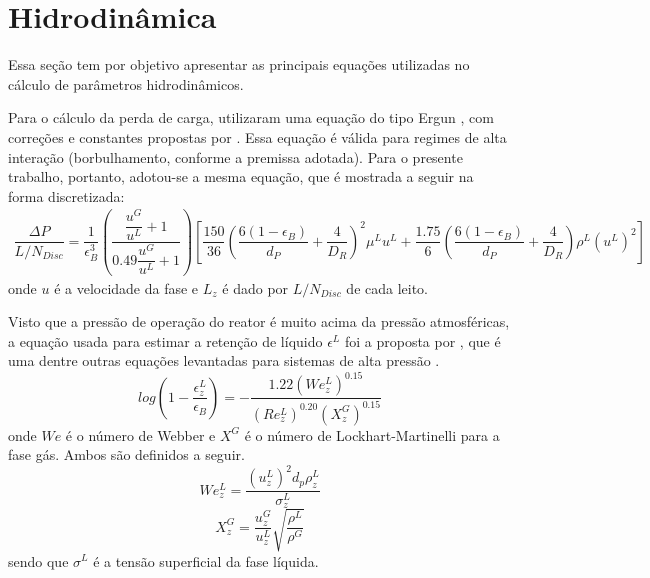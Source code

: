 
\section{Hidrodinâmica} \label{sec:hidrodinamica3}

Essa seção tem por objetivo apresentar as principais equações utilizadas no
cálculo de parâmetros hidrodinâmicos.

Para o cálculo da perda de carga,  utilizaram uma equação
do tipo Ergun , com correções e constantes propostas
por . Essa equação é válida para regimes de alta
interação (borbulhamento, conforme a premissa adotada). Para o presente
trabalho, portanto, adotou-se a mesma equação, que é mostrada a seguir na forma
discretizada:
\begin{equation}
\label{eq:deltaP}
\begin{split}
\dfrac{\Delta P }{L/N_{Disc}} = \dfrac{1}{\epsilon_B^{3}}
\left(\dfrac{\dfrac{u^{G}}{u^{L}} + 1}{0.49\dfrac{u^{G}}{u^{L}} + 1}\right)
\left[\dfrac{150}{36}\left(\dfrac{6(1-\epsilon_B)}{d_P}+\dfrac{4}{D_R}
\right)^2\mu^{L}u^{L} + \dfrac{1.75}{6} \left(\dfrac{6(1-\epsilon_B)}{d_P} +
\dfrac{4}{D_R}\right)\rho^{L}(u^{L})^2 \right]
\end{split}
\end{equation}
onde $u$ é a velocidade da fase e $L_z$ é dado por $L/N_{Disc}$ de cada leito.


Visto que a pressão de operação do reator é muito acima da pressão atmosféricas,
a equação usada para estimar a retenção de líquido $\epsilon^L$ foi a proposta
por , que é uma dentre outras
equações levantadas para sistemas de alta pressão \cite{Ancheyta2011}.
\begin{equation}
log \left (1-\dfrac{\epsilon_{z}^L}{\epsilon_B} \right) =
-\dfrac{1.22(We_{z}^L)^{0.15}}{(Re_{z}^L)^{0.20}(X_{z}^G)^{0.15}}
\label{eq:epsilonL}
\end{equation}
onde $We$ é o número de Webber e $X^G$ é o número de Lockhart-Martinelli
para a fase gás. Ambos são definidos a seguir.
\begin{equation}
We_{z}^L = \dfrac{(u_{z}^L)^2d_p\rho_{z}^L}{\sigma_{z}^L}
\label{eq:webber}
\end{equation}
\begin{equation}
X_{z}^G = \dfrac{u_{z}^G}{u_z^L} \sqrt{\dfrac{\rho^L}{\rho^G}}
\label{eq:X}
\end{equation}
sendo que $\sigma^L$ é a tensão superficial da fase líquida.


